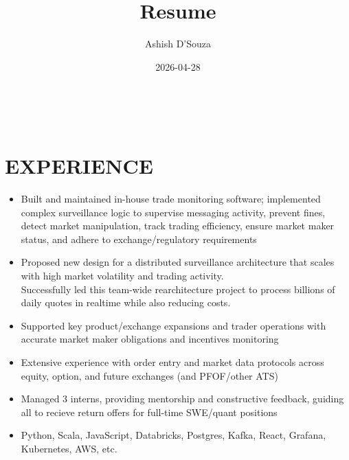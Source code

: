 \documentclass[11pt,letterpaper]{article}
\title{Resume}
\date{2026-04-28}
\author{Ashish D'Souza}
\begin{document}
  \ebgaramond


  \begin{center}
    {\fontsize{24}{24}}
    \\
    {\fontsize{10}{10}}
  \end{center}


  \section*{EXPERIENCE}

  \ifakuna
    {\fontsize{12}{12}}

    \begin{itemize}
      \item{Built and maintained in-house trade monitoring software; implemented complex surveillance logic to supervise messaging activity, prevent fines, detect market manipulation, track trading efficiency, ensure market maker status, and adhere to exchange/regulatory requirements}
      \item{Proposed new design for a distributed surveillance architecture that scales with high market volatility and trading activity. \\
            Successfully led this team-wide rearchitecture project to process billions of daily quotes in realtime while also reducing costs.}
      \item{Supported key product/exchange expansions and trader operations with accurate market maker obligations and incentives monitoring}
      \item{Extensive experience with order entry and market data protocols across equity, option, and future exchanges (and PFOF/other ATS)}
      \item{Managed 3 interns, providing mentorship and constructive feedback, guiding all to recieve return offers for full-time SWE/quant positions}
      \item{
        {}
        Python, Scala, JavaScript, Databricks, Postgres, Kafka, React, Grafana, Kubernetes, AWS, etc.
      }
    \end{itemize}
  \fi
\end{document}
